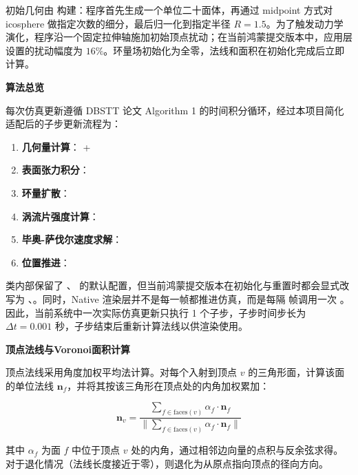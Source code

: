 初始几何由  构建：程序首先生成一个单位二十面体，再通过 midpoint 方式对 icosphere 做指定次数的细分，最后归一化到指定半径 $R = 1.5$。为了触发动力学演化，程序沿一个固定拉伸轴施加初始顶点扰动；在当前鸿蒙提交版本中，应用层设置的扰动幅度为 $16\%$。环量场初始化为全零，法线和面积在初始化完成后立即计算。

\textbf{算法总览}

每次仿真更新遵循 DBSTT 论文\cite{da2015doublebubbles} Algorithm 1 的时间积分循环，经过本项目简化适配后的子步更新流程为：

\begin{enumerate}
  \item \textbf{几何量计算}： + 
  \item \textbf{表面张力积分}：
  \item \textbf{环量扩散}：
  \item \textbf{涡流片强度计算}：
  \item \textbf{毕奥-萨伐尔速度求解}：
  \item \textbf{位置推进}：
\end{enumerate}

 类内部保留了 、 的默认配置，但当前鸿蒙提交版本在初始化与重置时都会显式改写为 、。同时，Native 渲染层并不是每一帧都推进仿真，而是每隔  帧调用一次 。因此，当前系统中一次实际仿真更新只执行 1 个子步，子步时间步长为 $\Delta t = 0.001$ 秒，子步结束后重新计算法线以供渲染使用。

\textbf{顶点法线与Voronoi面积计算}

顶点法线采用角度加权平均法计算。对每个入射到顶点 $v$ 的三角形面，计算该面的单位法线 $\mathbf{n}_f$，并将其按该三角形在顶点处的内角加权累加：

\begin{equation}
\mathbf{n}_v = \frac{\sum_{f \in \text{faces}(v)} \alpha_f \cdot \mathbf{n}_f}
                 {\bigl\| \sum_{f \in \text{faces}(v)} \alpha_f \cdot \mathbf{n}_f \bigr\|}
\label{eq:angle_weighted_normal}
\end{equation}

其中 $\alpha_f$ 为面 $f$ 中位于顶点 $v$ 处的内角，通过相邻边向量的点积与反余弦求得。对于退化情况（法线长度接近于零），则退化为从原点指向顶点的径向方向。

